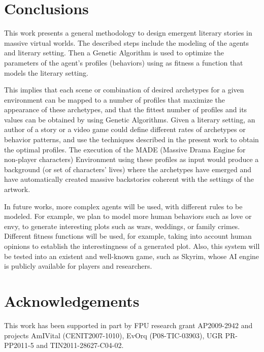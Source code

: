 \documentclass[letterpaper]{article}
\begin{document}
\section{Conclusions}
\label{sec:conclusion}



This work presents a general methodology to design emergent literary stories in massive virtual worlds. The described steps include the modeling of the agents and literary setting. Then a Genetic Algorithm is used to optimize the parameters of the agent's profiles (behaviors) using
as fitness a function that models the literary setting. 

This implies that each scene or combination of desired archetypes for a given
environment can be mapped to a number of profiles that maximize the appearance
of these archetypes, and that the fittest number of profiles and its values can
be obtained by using Genetic Algorithms.  
Given a literary setting, an author of a story or a video game could define 
different rates of archetypes or behavior patterns, and use the techniques described in
the present work to obtain the optimal profiles. The execution of the MADE (Massive Drama Engine for non-player characters) Environment
using these profiles as input would produce a background (or set of characters' lives)
where the archetypes have emerged and have automatically created massive backstories coherent
with the settings of the artwork.

In future works, more complex agents will be used, with different rules to be modeled. For example, we plan to model more human behaviors such as love or envy, to generate interesting plots such as wars, weddings, or family crimes. Different fitness functions will be used, for example, taking into account human opinions to establish the interestingness of a generated plot. Also, this system will be tested into an existent and well-known game, such as Skyrim\texttrademark, whose AI engine is publicly available for players and researchers.


\section{Acknowledgements}

This work has been supported in part by FPU research grant AP2009-2942 and projects AmIVital (CENIT2007-1010), EvOrq (P08-TIC-03903), UGR PR-PP2011-5 and TIN2011-28627-C04-02.
\footnotesize


\end{document}
